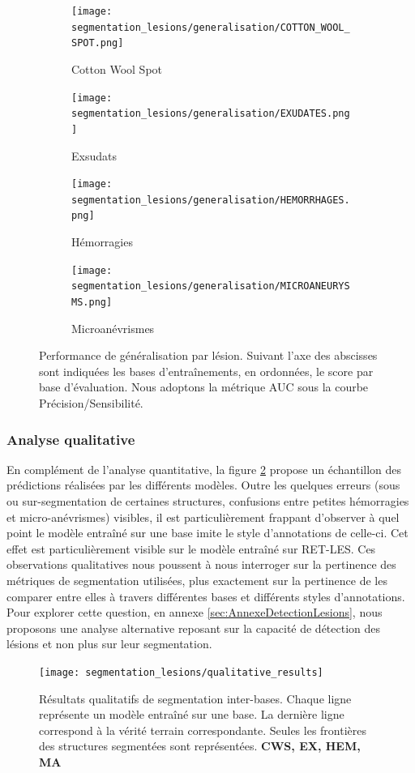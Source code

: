\begin{figure}
	\centering
	\begin{subfigure}{.49\textwidth}
		\texttt{[image: segmentation\_lesions/generalisation/COTTON\_WOOL\_SPOT.png]}
		\caption{Cotton Wool Spot}
	\end{subfigure}
	\begin{subfigure}{.49\textwidth}
		\texttt{[image: segmentation\_lesions/generalisation/EXUDATES.png]}
		\caption{Exsudats}
	\end{subfigure}
	\begin{subfigure}{.49\textwidth}
		\texttt{[image: segmentation\_lesions/generalisation/HEMORRHAGES.png]}
		\caption{Hémorragies}
	\end{subfigure}
	\begin{subfigure}{.49\textwidth}
		\texttt{[image: segmentation\_lesions/generalisation/MICROANEURYSMS.png]}
		\caption{Microanévrismes}
	\end{subfigure}
	\caption{Performance de généralisation par lésion. Suivant l'axe des abscisses sont indiquées les bases d'entraînements, en ordonnées, le score par base d'évaluation. Nous adoptons la métrique \ac{AUC} sous la courbe Précision/Sensibilité.}
	\label{fig:multilesionsGeneralisationScore}
\end{figure}
\subsubsection{Analyse qualitative}
\label{sec:SegmentationQualitativeAnalyse}
En complément de l'analyse quantitative, la figure \ref{fig:segQualitativeResults} propose un échantillon des prédictions réalisées par les différents modèles. Outre les quelques erreurs (sous ou sur-segmentation de certaines structures, confusions entre petites hémorragies et micro-anévrismes) visibles, il est particulièrement frappant d'observer à quel point le modèle entraîné sur une base imite le style d'annotations de celle-ci. Cet effet est particulièrement visible sur le modèle entraîné sur RET-LES. Ces observations qualitatives nous poussent à nous interroger sur la pertinence des métriques de segmentation utilisées, plus exactement sur la pertinence de les comparer entre elles à travers différentes bases et différents styles d'annotations. Pour explorer cette question, en annexe \ref{sec:AnnexeDetectionLesions}, nous proposons une analyse alternative reposant sur la capacité de détection des lésions et non plus sur leur segmentation.
\begin{figure}
	\centering
	\texttt{[image: segmentation\_lesions/qualitative\_results]}
	\caption{Résultats qualitatifs de segmentation inter-bases. Chaque ligne représente un modèle entraîné sur une base. La dernière ligne correspond à la vérité terrain correspondante. Seules les frontières des structures segmentées sont représentées. \textbf{\textcolor{CWScolor}{\ac{CWS}}, \textcolor{EXcolor}{\ac{EX}}, \textcolor{HEcolor}{\ac{HEM}}, \textcolor{MAcolor}{\ac{MA}}}}
	\label{fig:segQualitativeResults}
\end{figure}

